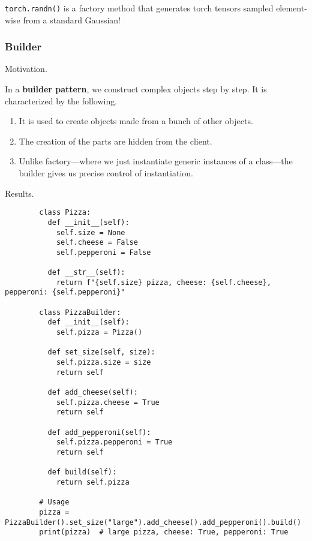     \begin{example}
      \texttt{torch.randn()} is a factory method that generates torch tensors sampled element-wise from a standard Gaussian! 
    \end{example}

  \subsubsection{Builder} 

    Motivation. 

    \begin{definition}
      In a \textbf{builder pattern}, we construct complex objects step by step. It is characterized by the following. 
      \begin{enumerate}
        \item It is used to create objects made from a bunch of other objects. 
        \item The creation of the parts are hidden from the client. 
        \item Unlike factory---where we just instantiate generic instances of a class---the builder gives us precise control of instantiation. 
      \end{enumerate}
    \end{definition}

    Results. 

    \begin{example}[Pizza]
      \begin{lstlisting}
        class Pizza:
          def __init__(self):
            self.size = None
            self.cheese = False
            self.pepperoni = False
          
          def __str__(self):
            return f"{self.size} pizza, cheese: {self.cheese}, pepperoni: {self.pepperoni}"

        class PizzaBuilder:
          def __init__(self):
            self.pizza = Pizza()
          
          def set_size(self, size):
            self.pizza.size = size
            return self
          
          def add_cheese(self):
            self.pizza.cheese = True
            return self
          
          def add_pepperoni(self):
            self.pizza.pepperoni = True
            return self
          
          def build(self):
            return self.pizza

        # Usage
        pizza = PizzaBuilder().set_size("large").add_cheese().add_pepperoni().build()
        print(pizza)  # large pizza, cheese: True, pepperoni: True 
      \end{lstlisting}
    \end{example}

